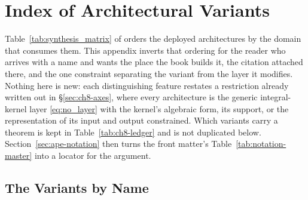 \chapter{Index of Architectural Variants}\label{app:e}

Table~\ref{tab:synthesis_matrix} of
 orders the deployed
architectures by the domain that consumes them. This appendix inverts that ordering for
the reader who arrives with a name and wants the place the book builds it, the citation
attached there, and the one constraint separating the variant from the layer it modifies.
Nothing here is new: each distinguishing feature restates a restriction already written
out in \S\ref{sec:ch8-axes}, where every architecture is the generic integral-kernel layer
\eqref{eq:no_layer} with the kernel's algebraic form, its support, or the representation of
its input and output constrained. Which variants carry a theorem is kept in
Table~\ref{tab:ch8-ledger} and is not duplicated below. Section~\ref{sec:ape-notation}
then turns the front matter's Table~\ref{tab:notation-master} into a locator for the
argument.

\section{The Variants by Name}
\label{sec:ape-variants}

